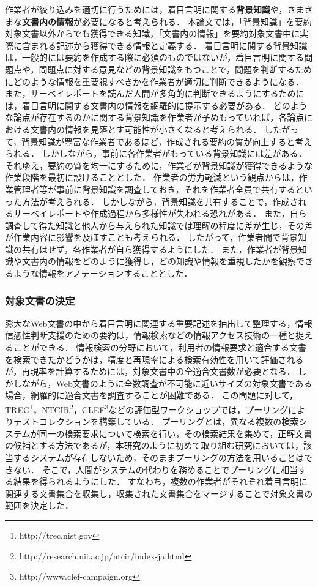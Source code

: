 \documentclass[japanese]{jnlp_1.4}
\begin{document}
作業者が絞り込みを適切に行うためには，着目言明に関する{\bf 背景知識}や，さまざまな{\bf 文書内の情報}が必要になると考えられる．
本論文では，「背景知識」を要約対象文書以外からでも獲得できる知識，「文書内の情報」を要約対象文書中に実際に含まれる記述から獲得できる情報と定義する．
着目言明に関する背景知識は，一般的には要約を作成する際に必須のものではないが，着目言明に関する問題点や，問題点に対する意見などの背景知識をもつことで，問題を判断するためにどのような情報を重要視すべきかを作業者が適切に判断できるようになる．
また，サーベイレポートを読んだ人間が多角的に判断できるようにするためには，着目言明に関する文書内の情報を網羅的に提示する必要がある．
どのような論点が存在するのかに関する背景知識を作業者が予めもっていれば，各論点における文書内の情報を見落とす可能性が小さくなると考えられる．
したがって，背景知識が豊富な作業者であるほど，作成される要約の質が向上すると考えられる．
しかしながら，事前に各作業者がもっている背景知識には差がある．
それゆえ，要約の質を均一にするために，作業者が背景知識が獲得できるような作業段階を最初に設けることとした．
{作業者}の労力軽減という観点からは，作業管理者等が事前に背景知識を調査しておき，それを作業者全員で共有するといった方法が考えられる．
しかしながら，背景知識を共有することで，作成されるサーベイレポートや作成過程から多様性が失われる恐れがある．
また，自ら調査して得た知識と他人から与えられた知識では理解の程度に差が生じ，その差が作業内容に影響を及ぼすことも考えられる．
したがって，作業者間で背景知識の共有はせず，各作業者が自ら獲得するようにした．
また，作業者が背景知識や文書内の情報をどのように獲得し，どの知識や情報を重視したかを観察できるような情報をアノテーションすることとした．


\subsubsection{対象文書の決定}

膨大なWeb文書の中から着目言明に関連する重要記述を抽出して整理する，情報信憑性判断支援のための要約は，情報検索などの情報アクセス技術の一種と捉えることができる．
情報検索の分野において，利用者の情報要求と適合する文書を検索できたかどうかは，精度と再現率による検索有効性を用いて評価されるが，再現率を計算するためには，対象文書中の全適合文書数が必要となる．
しかしながら，Web文書のように全数調査が不可能に近いサイズの対象文書である場合，網羅的に適合文書を調査することが困難である．
この問題に対して，TREC\footnote{http://trec.nist.gov}，NTCIR\footnote{http://research.nii.ac.jp/ntcir/index-ja.html}，CLEF\footnote{http://www.clef-campaign.org}などの評価型ワークショップでは，プーリングによりテストコレクションを構築している\cite{Buckley2007}．
プーリングとは，異なる複数の検索システムが同一の検索要求について検索を行い，その検索結果を集めて，正解文書の候補とする方法であるが，本研究のように初めて取り組む研究においては，該当するシステムが存在しないため，そのままプーリングの方法を用いることはできない．
そこで，人間がシステムの代わりを務めることでプーリングに相当する結果を得られるようにした．
すなわち，複数の作業者がそれぞれ着目言明に関連する文書集合を収集し，収集された文書集合をマージすることで対象文書の範囲を決定した．
\end{document}

